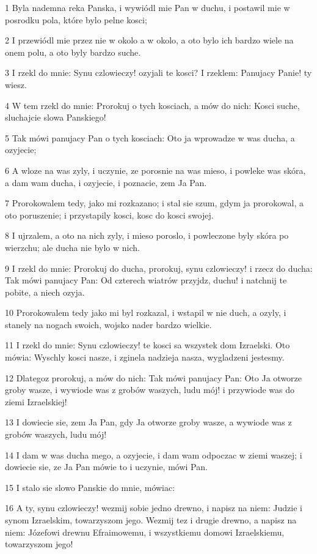 \par 1 Byla nademna reka Panska, i wywiódl mie Pan w duchu, i postawil mie w posrodku pola, które bylo pelne kosci;
\par 2 I przewiódl mie przez nie w okolo a w okolo, a oto bylo ich bardzo wiele na onem polu, a oto byly bardzo suche.
\par 3 I rzekl do mnie: Synu czlowieczy! ozyjali te kosci? I rzeklem: Panujacy Panie! ty wiesz.
\par 4 W tem rzekl do mnie: Prorokuj o tych kosciach, a mów do nich: Kosci suche, sluchajcie slowa Panskiego!
\par 5 Tak mówi panujacy Pan o tych kosciach: Oto ja wprowadze w was ducha, a ozyjecie;
\par 6 A wloze na was zyly, i uczynie, ze porosnie na was mieso, i powleke was skóra, a dam wam ducha, i ozyjecie, i poznacie, zem Ja Pan.
\par 7 Prorokowalem tedy, jako mi rozkazano; i stal sie szum, gdym ja prorokowal, a oto poruszenie; i przystapily kosci, kosc do kosci swojej.
\par 8 I ujrzalem, a oto na nich zyly, i mieso poroslo, i powleczone byly skóra po wierzchu; ale ducha nie bylo w nich.
\par 9 I rzekl do mnie: Prorokuj do ducha, prorokuj, synu czlowieczy! i rzecz do ducha: Tak mówi panujacy Pan: Od czterech wiatrów przyjdz, duchu! i natchnij te pobite, a niech ozyja.
\par 10 Prorokowalem tedy jako mi byl rozkazal, i wstapil w nie duch, a ozyly, i stanely na nogach swoich, wojsko nader bardzo wielkie.
\par 11 I rzekl do mnie: Synu czlowieczy! te kosci sa wszystek dom Izraelski. Oto mówia: Wyschly kosci nasze, i zginela nadzieja nasza, wygladzeni jestesmy.
\par 12 Dlategoz prorokuj, a mów do nich: Tak mówi panujacy Pan: Oto Ja otworze groby wasze, i wywiode was z grobów waszych, ludu mój! i przywiode was do ziemi Izraelskiej!
\par 13 I dowiecie sie, zem Ja Pan, gdy Ja otworze groby wasze, a wywiode was z grobów waszych, ludu mój!
\par 14 I dam w was ducha mego, a ozyjecie, i dam wam odpoczac w ziemi waszej; i dowiecie sie, ze Ja Pan mówie to i uczynie, mówi Pan.
\par 15 I stalo sie slowo Panskie do mnie, mówiac:
\par 16 A ty, synu czlowieczy! wezmij sobie jedno drewno, i napisz na niem: Judzie i synom Izraelskim, towarzyszom jego. Wezmij tez i drugie drewno, a napisz na niem: Józefowi drewnu Efraimowemu, i wszystkiemu domowi Izraelskiemu, towarzyszom jego!
